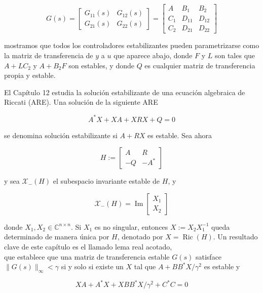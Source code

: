 $$
G(s)=\left[\begin{array}{cc}
G_{11}(s) & G_{12}(s) \\
G_{21}(s) & G_{22}(s)
\end{array}\right]=\left[\begin{array}{c|cc}
A & B_{1} & B_{2} \\
\hline C_{1} & D_{11} & D_{12} \\
C_{2} & D_{21} & D_{22}
\end{array}\right]
$$

mostramos que todos los controladores estabilizantes pueden parametrizarse como la matriz de transferencia de $y$ a $u$ que aparece abajo, donde $F$ y $L$ son tales que $A+L C_{2}$ y $A+B_{2} F$ son estables, y donde $Q$ es cualquier matriz de transferencia propia y estable.


El Capítulo 12 estudia la solución estabilizante de una ecuación algebraica de Riccati (ARE). Una solución de la siguiente ARE

$$
A^{*} X+X A+X R X+Q=0
$$

se denomina solución estabilizante si $A+R X$ es estable. Sea ahora

$$
H:=\left[\begin{array}{cc}
A & R \\
-Q & -A^{*}
\end{array}\right]
$$

y sea $\mathcal{X}_{-}(H)$ el subespacio invariante estable de $H$, y

$$
\mathcal{X}_{-}(H)=\operatorname{Im}\left[\begin{array}{l}
X_{1} \\
X_{2}
\end{array}\right]
$$

donde $X_{1}, X_{2} \in \mathbb{C}^{n \times n}$. Si $X_{1}$ es no singular, entonces $X:=X_{2} X_{1}^{-1}$ queda determinado de manera única por $H$, denotado por $X=\operatorname{Ric}(H)$. Un resultado clave de este capítulo es el llamado lema real acotado,\\
que establece que una matriz de transferencia estable $G(s)$ satisface $\|G(s)\|_{\infty}<\gamma$ si y solo si existe un $X$ tal que $A+B B^{*} X / \gamma^{2}$ es estable y

$$
X A+A^{*} X+X B B^{*} X / \gamma^{2}+C^{*} C=0
$$


